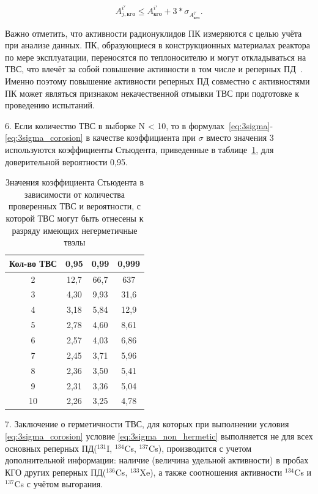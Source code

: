 \begin{equation} \label{eq:3sigma_corosion}
	A_{j,кго}^{i'} \leq {A}_{кго}^{i'} + 3*\sigma_{{A}_{кго}^{i'}}.
\end{equation}

Важно отметить, что активности радионуклидов ПК измеряются с целью учёта при анализе данных. ПК, образующиеся в конструкционных материалах реактора по мере эксплуатации, переносятся по теплоносителю и могут откладываться на ТВС, что влечёт за собой повышение активности в том числе и реперных ПД~\cite{corosion}. Именно поэтому повышение активности реперных ПД совместно с активностями ПК может являться признаком некачественной отмывки ТВС при подготовке к проведению испытаний.

6. Если количество ТВС в выборке N < 10, то в формулах~\ref{eq:3sigma}-\ref{eq:3sigma_corosion}  в качестве коэффициента при $\sigma$  вместо значения 3 используются коэффициенты Стьюдента, приведенные в таблице~\ref{tab:Student}, для доверительной вероятности 0,95.
\begin{table}[H]
	\caption{Значения коэффициента Стьюдента в зависимости от количества проверенных ТВС и вероятности, с которой ТВС могут быть отнесены к разряду имеющих негерметичные твэлы} \label{tab:Student}
	\centering
	\begin{tabular}{|c|c|c|c|}
		\hline Кол-во ТВС & 0,95 & 0,99 & 0,999 \\ 
		\hline  2 & 12,7 & 66,7  & 637 \\ 
		\hline 3 &  4,30 &  9,93 & 31,6 \\ 
		\hline 4 &  3,18 &  5,84 & 12,9 \\ 
		\hline 5 &  2,78 &  4,60 & 8,61 \\ 
		\hline 6 &  2,57 &  4,03 & 6,86 \\ 
		\hline 7 &  2,45 &  3,71 & 5,96 \\ 
		\hline 8 &  2,36 &  3,50 & 5,41 \\ 
		\hline 9 &  2,31 &  3,36 & 5,04 \\ 
		\hline 10 & 2,26 &  3,25 & 4,78 \\ 
		\hline 
	\end{tabular} 
\end{table} 

7. Заключение о герметичности ТВС, для которых при выполнении
условия \ref{eq:3sigma_corosion} условие \ref{eq:3sigma_non_hermetic} выполняется не для всех основных реперных ПД($^{131}$I, $^{134}$Cs, $^{137}$Cs), производится с учетом дополнительной информации: наличие
(величина удельной активности) в пробах КГО других реперных ПД($^{136}$Cs, $^{133}$Xe), а также соотношения активности $^{134}$Cs и $^{137}$Cs с учётом выгорания.

